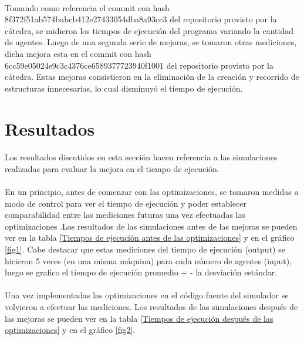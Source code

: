 \documentclass{article}
\begin{document}
\paragraph{}
Tomando como referencia el commit con hash 8f372f51ab574babcb412e27433054dba8a93cc3 del repositorio provisto por la cátedra, se midieron los tiempos de ejecución del programa variando la cantidad de agentes. Luego de una segunda serie de mejoras, se tomaron otras mediciones, dicha mejora esta en el commit con hash 6cc59e05024e9c3c4376ce6589377723940f1001 del repositorio provisto por la cátedra. Estas mejoras consistieron en la eliminación de la creación y recorrido de estructuras innecesarias, lo cual disminuyó el tiempo de ejecución.

\section{Resultados}

\paragraph{}
Los resultados discutidos en esta sección hacen referencia a las simulaciones realizadas para evaluar la mejora en el tiempo de ejecución.

\paragraph{}
En un principio, antes de comenzar con las optimizaciones, se tomaron medidas a modo de control para ver el tiempo de ejecución y poder establecer comparabilidad entre las mediciones futuras una vez efectuadas las optimizaciones .Los resultados de las simulaciones antes de las mejoras se pueden ver en la tabla \ref{Tiempos de ejecución antes de las optimizaciones} y en el gráfico \ref{fig1}. Cabe destacar que estas mediciones del tiempo de ejecución (output) se hicieron 5 veces (en una misma máquina)  para cada número de agentes (input), luego se grafico el tiempo de ejecución promedio + - la desviación estándar.

\paragraph{}
Una vez implementadas las optimizaciones en el código fuente del simulador se volvieron a efectuar las mediciones. Los resultados de las simulaciones después de las mejoras se pueden ver en la tabla \ref{Tiempos de ejecución después de las optimizaciones} y en el gráfico \ref{fig2}.
\end{document}

